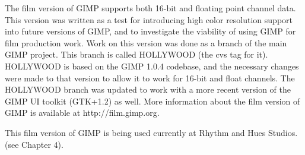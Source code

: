 The film version of GIMP supports both 16-bit and floating point channel data.
This version was written as a test for introducing high color resolution
support into future versions of GIMP, and to investigate the viability of using
GIMP for film production work. Work on this version was done as a branch of the
main GIMP project. This branch is called HOLLYWOOD (the cvs tag for it).
HOLLYWOOD is based on the GIMP 1.0.4 codebase, and the necessary changes were
made to that version to allow it to work for 16-bit and float channels. The
HOLLYWOOD branch was updated to work with a more recent version of the GIMP UI 
toolkit (GTK+1.2) as well.  More information about the film version of GIMP is
available at http://film.gimp.org.

This film version of GIMP is being used currently at Rhythm and Hues Studios.
(see Chapter 4).
